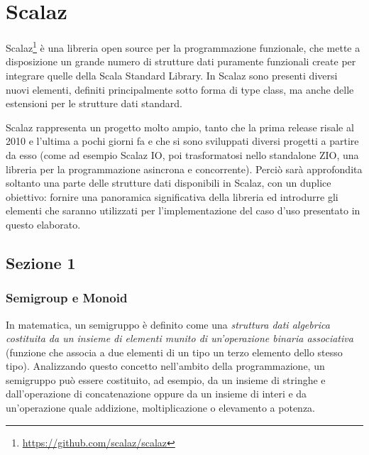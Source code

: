 \chapter{Scalaz} %

\label{Chapter1} %

Scalaz\footnote{\url{https://github.com/scalaz/scalaz}} è una libreria open source per la programmazione funzionale, che mette a disposizione un grande numero di strutture dati puramente funzionali create per integrare quelle della Scala Standard Library. In Scalaz sono presenti diversi nuovi elementi, definiti principalmente sotto forma di type class, ma anche delle estensioni per le strutture dati standard.

Scalaz rappresenta un progetto molto ampio, tanto che la prima release risale al 2010 e l'ultima a pochi giorni fa e che si sono sviluppati diversi progetti a partire da esso (come ad esempio Scalaz IO, poi trasformatosi nello standalone ZIO, una libreria per la programmazione asincrona e concorrente). Perciò sarà approfondita soltanto una parte delle strutture dati disponibili in Scalaz, con un duplice obiettivo: fornire una panoramica significativa della libreria ed introdurre gli elementi che saranno utilizzati per l'implementazione del caso d'uso presentato in questo elaborato.


\section{Sezione 1}

\newpage

\subsection{Semigroup e Monoid}

In matematica, un semigruppo è definito come una \textit{struttura dati algebrica costituita da un insieme di elementi munito di un'operazione binaria associativa} (funzione che associa a due elementi di un tipo un terzo elemento dello stesso tipo). Analizzando questo concetto nell'ambito della programmazione, un semigruppo può essere costituito, ad esempio, da un insieme di stringhe e dall'operazione di concatenazione oppure da un insieme di interi e da un'operazione quale addizione, moltiplicazione o elevamento a potenza.

